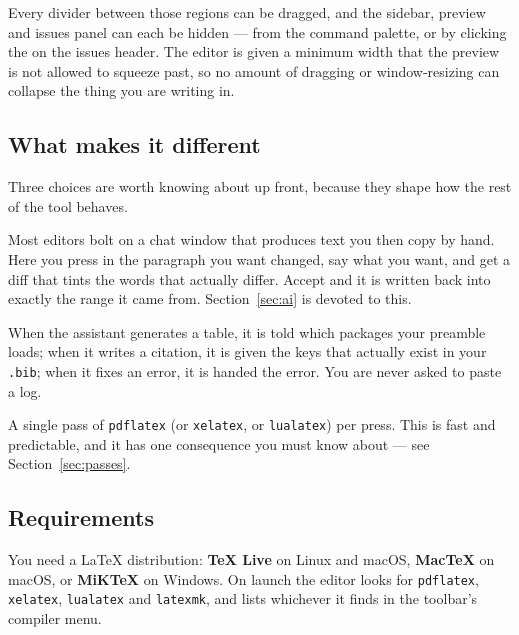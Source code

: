 Every divider between those regions can be dragged, and the sidebar, preview
and issues panel can each be hidden --- from the command palette, or by
clicking the \ui{$\times$} on the issues header. The editor is given a minimum
width that the preview is not allowed to squeeze past, so no amount of dragging
or window-resizing can collapse the thing you are writing in.

\subsection{What makes it different}

Three choices are worth knowing about up front, because they shape how the rest
of the tool behaves.

\begin{description}[style=nextline, leftmargin=0pt, labelindent=0pt, labelwidth=0pt, font=\normalfont\itshape]

  \item[The AI edits the document.]
  Most editors bolt on a chat window that produces text you then copy by hand.
  Here you press  in the paragraph you want changed, say what you
  want, and get a diff that tints the words that actually differ. Accept and it
  is written back into exactly the range it came from.
  Section~\ref{sec:ai} is devoted to this.

  \item[It knows your project, not just your file.]
  When the assistant generates a table, it is told which packages your preamble
  loads; when it writes a citation, it is given the keys that actually exist in
  your \texttt{.bib}; when it fixes an error, it is handed the error. You are
  never asked to paste a log.

  \item[It typesets locally, once.]
  A single pass of \texttt{pdflatex} (or \texttt{xelatex}, or
  \texttt{lualatex}) per press. This is fast and predictable, and it has one
  consequence you must know about --- see Section~\ref{sec:passes}.

\end{description}

\subsection{Requirements}

You need a \LaTeX{} distribution: \textbf{TeX Live} on Linux and macOS,
\textbf{MacTeX} on macOS, or \textbf{MiKTeX} on Windows. On launch the editor
looks for \texttt{pdflatex}, \texttt{xelatex}, \texttt{lualatex} and
\texttt{latexmk}, and lists whichever it finds in the toolbar's compiler menu.

